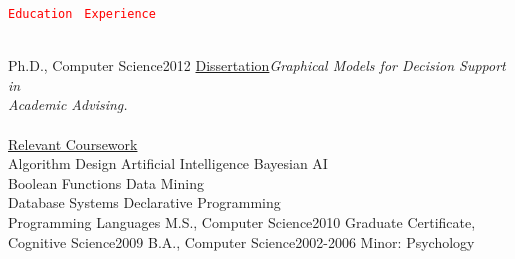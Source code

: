 \documentclass[
    10pt,
    A4,
    english,
    draft = false,
    twoside = false,
]{article}
\begin{document}
        \vspace{-5pt}
        {\textcolor{red}{\texttt{\Huge{E}\LARGE{ducation}\
} \hrulefill}}{\phantom{||||||}\textcolor{red}{\texttt{\Huge{E}\LARGE{xperience}\
} \hrulefill}}\\ \\
        \begin{minipage}[t]{0.49\textwidth}
	{Ph.D., Computer Science}{2012}
	{\underline{Dissertation}\newline \emph{Graphical Models for Decision Support in\\ Academic Advising.}\\\\
          \underline{Relevant Coursework}\\
        Algorithm Design \cvContactSep Artificial Intelligence \cvContactSep Bayesian AI \\ Boolean Functions \cvContactSep Data Mining  \\ Database Systems \cvContactSep Declarative Programming \\ Programming Languages}
        \vspace{-10pt}
        \CVBlockWithTime{}{}
	{M.S., Computer Science}{2010}
	{}
        \vspace{-20pt}
        \CVBlockWithTime{}{}
	{Graduate Certificate, Cognitive Science}{2009}
	{}
	{B.A., Computer Science}{2002-2006}
	{Minor: Psychology}
        \end{minipage}
\end{document}
